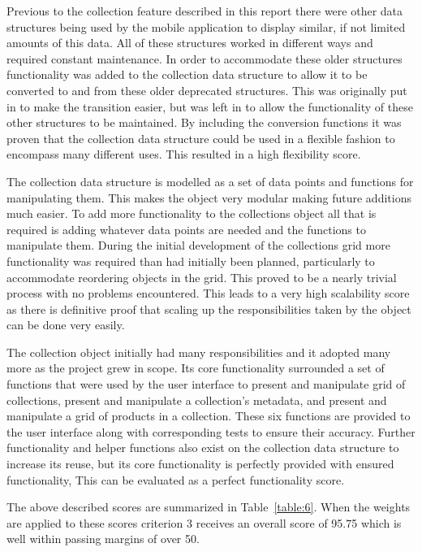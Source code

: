\documentclass[12pt]{article}
\begin{document}
Previous to the collection feature described in this report there were other data structures being used by the mobile application to display similar, if not limited amounts of this data. All of these structures worked in different ways and required constant maintenance. In order to accommodate these older structures functionality was added to the collection data structure to allow it to be converted to and from these older deprecated structures. This was originally put in to make the transition easier, but was left in to allow the functionality of these other structures to be maintained. By including the conversion functions it was proven that the collection data structure could be used in a flexible fashion to encompass many different uses. This resulted in a high flexibility score. 

The collection data structure is modelled as a set of data points and functions for manipulating them. This makes the object very modular making future additions much easier. To add more functionality to the collections object all that is required is adding whatever data points are needed and the functions to manipulate them. During the initial development of the collections grid more functionality was required than had initially been planned, particularly to accommodate reordering objects in the grid. This proved to be a nearly trivial process with no problems encountered. This leads to a very high scalability score as there is definitive proof that scaling up the responsibilities taken by the object can be done very easily. 

The collection object initially had many responsibilities and it adopted many more as the project grew in scope. Its core functionality surrounded a set of functions that were used by the user interface to present and manipulate grid of collections, present and manipulate a collection's metadata, and present and manipulate a grid of products in a collection. These six functions are provided to the user interface along with corresponding tests to ensure their accuracy. Further functionality and helper functions also exist on the collection data structure to increase its reuse, but its core functionality is perfectly provided with ensured functionality, This can be evaluated as a perfect functionality score.


The above described scores are summarized in Table~\ref{table:6}. When the weights are applied to these scores criterion 3 receives an overall score of 95.75 which is well within passing margins of over 50.
\end{document}
